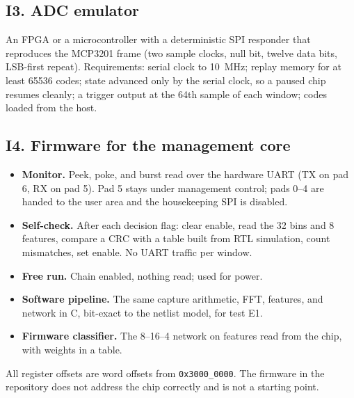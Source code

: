 \documentclass[10pt]{article}
\begin{document}
\subsection*{I3. ADC emulator}
An FPGA or a microcontroller with a deterministic SPI responder that
reproduces the MCP3201 frame (two sample clocks, null bit, twelve data
bits, LSB-first repeat). Requirements: serial clock to \SI{10}{\mega\hertz};
replay memory for at least \num{65536} codes; state advanced only by the
serial clock, so a paused chip resumes cleanly; a trigger output at the
64th sample of each window; codes loaded from the host.

\subsection*{I4. Firmware for the management core}
\begin{itemize}
\item \textbf{Monitor.} Peek, poke, and burst read over the hardware UART
(TX on pad 6, RX on pad 5). Pad 5 stays under management control; pads
0--4 are handed to the user area and the housekeeping SPI is disabled.
\item \textbf{Self-check.} After each decision flag: clear enable, read
the 32 bins and 8 features, compare a CRC with a table built from RTL
simulation, count mismatches, set enable. No UART traffic per window.
\item \textbf{Free run.} Chain enabled, nothing read; used for power.
\item \textbf{Software pipeline.} The same capture arithmetic, FFT,
features, and network in C, bit-exact to the netlist model, for test E1.
\item \textbf{Firmware classifier.} The 8--16--4 network on features read
from the chip, with weights in a table.
\end{itemize}
All register offsets are word offsets from \texttt{0x3000\_0000}. The
firmware in the repository does not address the chip correctly and is not
a starting point.
\end{document}
